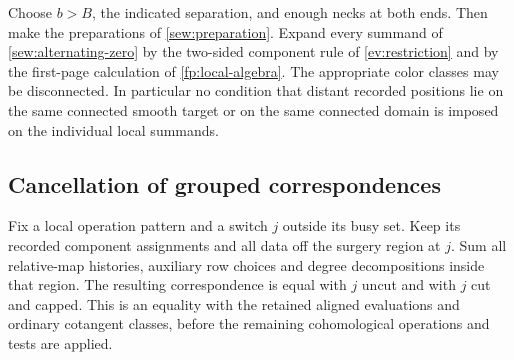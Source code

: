 Choose $b>B$, the indicated separation, and enough necks at both ends.
Then make the preparations of \cref{sew:preparation}.  Expand every
summand of \eqref{sew:alternating-zero} by the two-sided component rule
of \cref{ev:restriction} and by the first-page calculation of
\cref{fp:local-algebra}.  The appropriate color classes may be
disconnected.  In particular no condition that distant recorded
positions lie on the same connected smooth target or on the same
connected domain is imposed on the individual local summands.

\subsection{Cancellation of grouped correspondences}

\begin{lemma}\label{sew:idle-equality}
Fix a local operation pattern and a switch $j$ outside its busy set.
Keep its recorded component assignments and all data off the surgery
region at $j$.  Sum all relative-map histories, auxiliary row choices
and degree decompositions inside that region.  The resulting
correspondence is equal with $j$ uncut and with $j$ cut and capped.
This is an equality with the retained aligned evaluations and
ordinary cotangent classes, before the remaining cohomological
operations and tests are applied.
\end{lemma}

